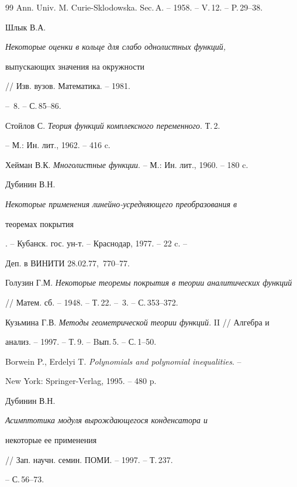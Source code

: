 \begin{thebibliography}{99}
Ann. Univ. M. Curie-Sklodowska. Sec.\,A. -- 1958. -- V.\,12. -- P.\,29--38.




Шлык В.А. {\em Некоторые оценки в кольце для слабо однолистных функций,


выпускающих значения на окружности} // Изв. вузов. Математика. -- 1981.


-- \No\,8. -- С.\,85--86.




Стойлов С. {\em Теория функций комплексного переменного}. Т.\,2.


-- М.: Ин. лит., 1962. -- 416 c.




Хейман В.К. {\em Многолистные функции}. -- М.: Ин. лит., 1960. -- 180 c.




Дубинин В.Н. {\em Некоторые применения линейно-усредняющего преобразования в


теоремах покрытия}. -- Кубанск. гос. ун-т. -- Краснодар, 1977. -- 22 c. --


Деп. в ВИНИТИ 28.02.77, \No\,770--77.




Голузин Г.М. {\em Некоторые теоремы покрытия в теории аналитических функций}


// Матем. сб. -- 1948. -- Т.\,22. -- \No\,3. -- С.\,353--372.




Кузьмина Г.В. {\em Методы геометрической теории функций}. II // Алгебра и


анализ. -- 1997. -- Т.\,9. -- Bып.\,5. -- С.\,1--50.




Borwein P., Erdelyi T. {\em Polynomials and polynomial inequalities}. --


New York: Springer-Verlag, 1995. -- 480 p.




Дубинин В.Н. {\em Асимптотика модуля вырождающегося конденсатора и


некоторые ее применения} // Зап. научн. семин. ПОМИ. -- 1997. -- Т.\,237.


-- С.\,56--73.





\end{thebibliography}





\vskip 2cm














\label{end}





